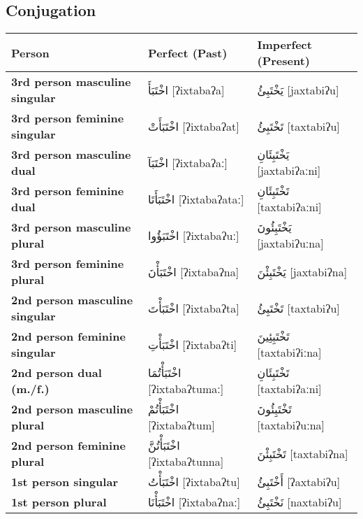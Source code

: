 \documentclass[letterpaper,12pt]{article}
\begin{document}
\subsection{Conjugation}
\begin{longtable}{|>{\raggedright}p{3.5cm}|p{5cm}|p{5cm}|}
\hline
\textbf{Person} & \textbf{Perfect (Past)} & \textbf{Imperfect (Present)} \\
\hline
\textbf{3rd person masculine singular} & \textarabic{اخْتَبَأَ} [ʔixtabaʔa] & \textarabic{يَخْتَبِئُ} [jaxtabiʔu] \\
\hline
\textbf{3rd person feminine singular} & \textarabic{اخْتَبَأَتْ} [ʔixtabaʔat] & \textarabic{تَخْتَبِئُ} [taxtabiʔu] \\
\hline
\textbf{3rd person masculine dual} & \textarabic{اخْتَبَآ} [ʔixtabaʔaː] & \textarabic{يَخْتَبِئَانِ} [jaxtabiʔaːni] \\
\hline
\textbf{3rd person feminine dual} & \textarabic{اخْتَبَأَتَا} [ʔixtabaʔataː] & \textarabic{تَخْتَبِئَانِ} [taxtabiʔaːni] \\
\hline
\textbf{3rd person masculine plural} & \textarabic{اخْتَبَؤُوا} [ʔixtabaʔuː] & \textarabic{يَخْتَبِئُونَ} [jaxtabiʔuːna] \\
\hline
\textbf{3rd person feminine plural} & \textarabic{اخْتَبَأْنَ} [ʔixtabaʔna] & \textarabic{يَخْتَبِئْنَ} [jaxtabiʔna] \\
\hline
\textbf{2nd person masculine singular} & \textarabic{اخْتَبَأْتَ} [ʔixtabaʔta] & \textarabic{تَخْتَبِئُ} [taxtabiʔu] \\
\hline
\textbf{2nd person feminine singular} & \textarabic{اخْتَبَأْتِ} [ʔixtabaʔti] & \textarabic{تَخْتَبِئِينَ} [taxtabiʔiːna] \\
\hline
\textbf{2nd person dual (m./f.)} & \textarabic{اخْتَبَأْتُمَا} [ʔixtabaʔtumaː] & \textarabic{تَخْتَبِئَانِ} [taxtabiʔaːni] \\
\hline
\textbf{2nd person masculine plural} & \textarabic{اخْتَبَأْتُمْ} [ʔixtabaʔtum] & \textarabic{تَخْتَبِئُونَ} [taxtabiʔuːna] \\
\hline
\textbf{2nd person feminine plural} & \textarabic{اخْتَبَأْتُنَّ} [ʔixtabaʔtunna] & \textarabic{تَخْتَبِئْنَ} [taxtabiʔna] \\
\hline
\textbf{1st person singular} & \textarabic{اخْتَبَأْتُ} [ʔixtabaʔtu] & \textarabic{أَخْتَبِئُ} [ʔaxtabiʔu] \\
\hline
\textbf{1st person plural} & \textarabic{اخْتَبَأْنَا} [ʔixtabaʔnaː] & \textarabic{نَخْتَبِئُ} [naxtabiʔu] \\
\hline
\end{longtable}
\end{document}
